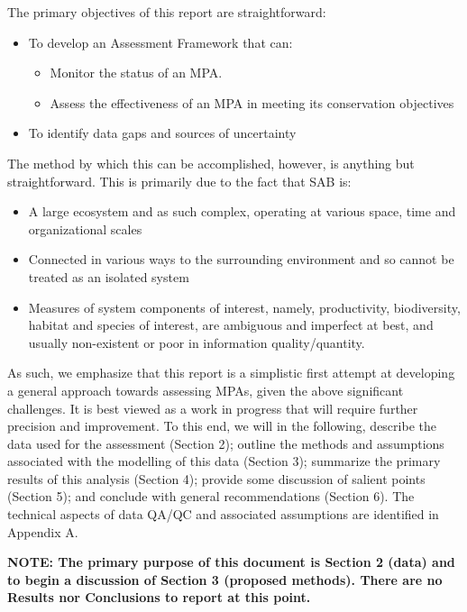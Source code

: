 \documentclass[letterpaper,portrait,11pt]{scrartcl}
\numberwithin{equation}{section}		%
\numberwithin{figure}{section}		%
\numberwithin{table}{section}				%
\begin{document}
The primary objectives of this report are straightforward:

\begin{itemize}
	\item To develop an Assessment Framework that can:
  \begin{itemize}
    \item	Monitor the status of an MPA.
  	\item Assess the effectiveness of an MPA in meeting its conservation objectives
  \end{itemize}
  \item To identify data gaps and sources of uncertainty 
\end{itemize}

The method by which this can be accomplished, however, is anything but straightforward. This is primarily due to the fact that SAB is:

\begin{itemize}
	\item A large ecosystem and as such complex, operating at various space, time and organizational scales
	\item Connected in various ways to the surrounding environment and so cannot be treated as an isolated system
	\item Measures of system components of interest, namely, productivity, biodiversity, habitat and species of interest, are ambiguous and imperfect at best, and usually non-existent or poor in information quality/quantity.
\end{itemize}


As such, we emphasize that this report is a simplistic first attempt at developing a general approach towards assessing MPAs, given the above significant challenges. It is best viewed as a work in progress that will require further precision and improvement. To this end, we will in the following, describe the data used for the assessment (Section 2); outline the methods and assumptions associated with the modelling of this data (Section 3); summarize the primary results of this analysis (Section 4); provide some discussion of salient points (Section 5); and conclude with general recommendations (Section 6). The technical aspects of data QA/QC and associated assumptions are identified in Appendix A. 

\medskip

\textbf{NOTE: The primary purpose of this document is Section 2 (data) and to begin a discussion of Section 3 (proposed methods). There are no Results nor Conclusions to report at this point. }
\end{document}
